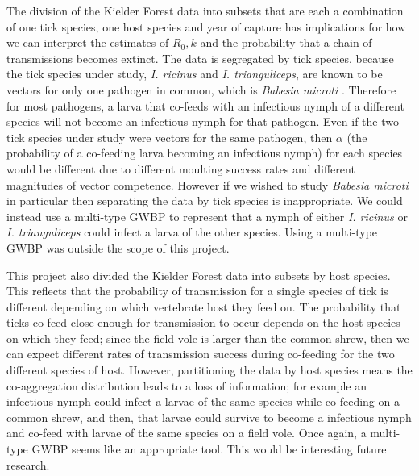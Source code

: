 \documentclass{article}
\begin{document}
The division of the Kielder Forest data into subsets that are each a combination of one tick species, one host species and year of capture has implications for how we can interpret the estimates of $ R_0, k $ and the probability that a chain of transmissions becomes extinct. The data is segregated by tick species, because the tick species under study, \textit{I. ricinus} and \textit{I. trianguliceps}, are known to be vectors for only one pathogen in common, which is \textit{Babesia microti} \cite{Gray2024, Rubel_2023}. Therefore for most pathogens, a larva that co-feeds with an infectious nymph of a different species will not become an infectious nymph for that pathogen. Even if the two tick species under study were vectors for the same pathogen, then $ \alpha $ (the probability of a co-feeding larva becoming an infectious nymph) for each species would be different due to different moulting success rates and different magnitudes of vector competence. However if we wished to study \textit{Babesia microti} in particular then separating the data by tick species is inappropriate. We could instead use a multi-type GWBP to represent that a nymph of either \textit{I. ricinus} or \textit{I. trianguliceps} could infect a larva of the other species. Using a multi-type GWBP was outside the scope of this project.

This project also divided the Kielder Forest data into subsets by host species. This reflects that the probability of transmission for a single species of tick is different depending on which vertebrate host they feed on. The probability that ticks co-feed close enough for transmission to occur depends on the host species on which they feed; since the field vole is larger than the common shrew, then we can expect different rates of transmission success during co-feeding for the two different species of host. However, partitioning the data by host species means the co-aggregation distribution leads to a loss of information; for example an infectious nymph could infect a larvae of the same species while co-feeding on a common shrew, and then, that larvae could survive to become a infectious nymph and co-feed with larvae of the same species on a field vole. Once again, a multi-type GWBP seems like an appropriate tool. This would be interesting future research.
\end{document}
